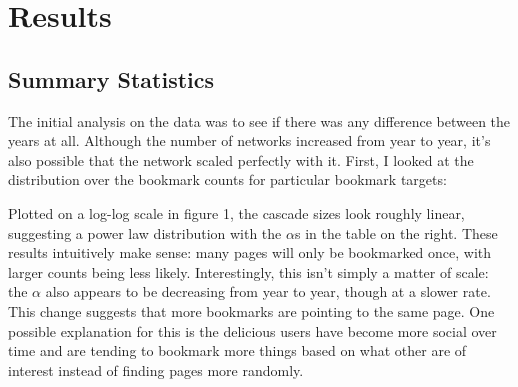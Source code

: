 \documentclass[11pt]{amsart}
\begin{document}
\section{Results}
\subsection{Summary Statistics}
The initial analysis on the data was to see if there was any difference between the years at all. Although the number of networks increased from year to year, it's also possible that the network scaled perfectly with it. First, I looked at the distribution over the bookmark counts for particular bookmark targets:

\begin{figure}
	\centering
\caption{}
\end{figure}

Plotted on a log-log scale in figure 1, the cascade sizes look roughly linear, suggesting a power law distribution with the $\alpha$s in the table on the right. These results intuitively make sense: many pages will only be bookmarked once, with larger counts being less likely. Interestingly, this isn't simply a matter of scale: the $\alpha$ also appears to be decreasing from year to year, though at a slower rate. This change suggests that more bookmarks are pointing to the same page. One possible explanation for this is the delicious users have become more social over time and are tending to bookmark more things based on what other are of interest instead of finding pages more randomly.
\end{document}
